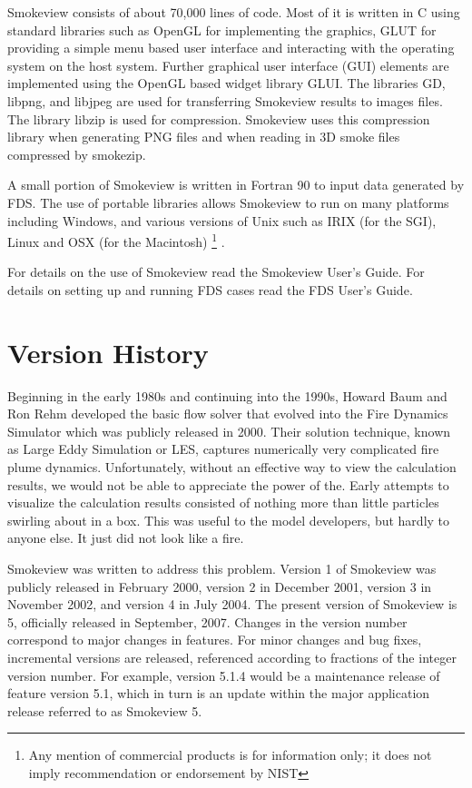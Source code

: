 \documentclass[11pt,twoside]{book}
\begin{document}
Smokeview consists of about 70,000 lines of code.  Most of it is
written in C using standard libraries such as
OpenGL\cite{OpenGLRed} for implementing the graphics, GLUT\cite{OpenGLGlut} for providing a
simple menu based user interface and interacting with the operating system on the host system.
Further graphical user interface (GUI) elements are implemented using the
OpenGL based widget library GLUI\cite{GLUILIB}.
The libraries GD\cite{GDLIB}, libpng\cite{PNGLIB},
and libjpeg\cite{JPEGLIB} are used for transferring Smokeview results to images files.  The library
libzip\cite{ZLIB} is used for compression.  Smokeview uses this compression library when generating PNG files and when reading in 3D smoke files compressed by smokezip.

A small portion of Smokeview is written in Fortran 90 to input data
generated by FDS.  The use of portable libraries allows Smokeview
to run on many platforms including Windows, and various versions
of Unix such as IRIX (for the SGI), Linux and OSX (for the
Macintosh)
\footnote{
Any mention of commercial products is for information only;  it does not imply recommendation or endorsement by NIST}
.

For details on the use of Smokeview read the Smokeview User's
Guide\cite{Smokeview_Users_Guide_5}. For details on setting up and
running FDS cases read the FDS User's
Guide\cite{FDS_Users_Guide_5}.

\section{Version History}

Beginning in the early 1980s and continuing into the 1990s, Howard Baum and Ron Rehm developed the basic flow solver that evolved into the Fire Dynamics Simulator which was publicly released in 2000.  Their solution technique, known as Large Eddy Simulation or LES, captures numerically very complicated fire plume dynamics.  Unfortunately, without an effective way to view the calculation results, we would not be able to appreciate the power of the.  Early attempts to visualize the calculation results consisted of nothing more than little particles swirling about in a box.  This was useful to the model developers, but hardly to anyone else.  It just did not look like a fire.

Smokeview was written to address this problem.  
Version 1 of Smokeview was publicly released in February 2000, version 2 in December 2001, version 3 in November 2002, and version 4 in July 2004.
The present version of Smokeview is 5, officially released in September, 2007. Changes in
the version number correspond to major changes in features. For minor changes and bug fixes, incremental
versions are released, referenced according to fractions of the integer
version number. For example, version 5.1.4 would be a maintenance release of feature
version 5.1, which in turn is an update within the major application release referred to as Smokeview 5.
\end{document}

